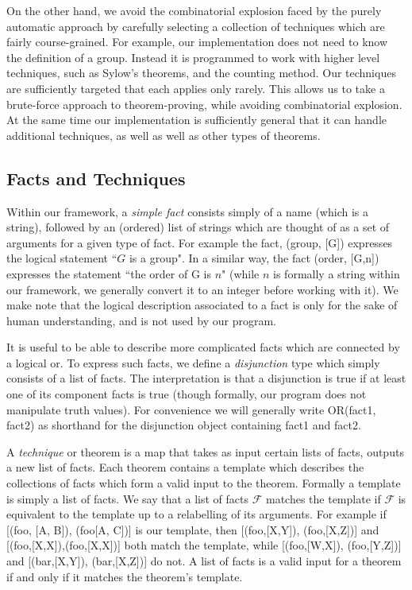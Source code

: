 \documentclass[11pt, oneside]{article}   	%
\begin{document}
On the other hand, we avoid the combinatorial explosion faced by the purely automatic approach by carefully selecting a collection of techniques which are fairly course-grained.  For example, our implementation does not need to know the definition of a group.  Instead it is programmed to work with higher level techniques, such as Sylow's theorems, and the counting method.  Our techniques are sufficiently targeted that each applies only rarely.  This allows us to take a brute-force approach to theorem-proving, while avoiding combinatorial explosion.  At the same time our implementation is sufficiently general that it can handle additional techniques, as well as well as other types of theorems.

\subsection{Facts and Techniques}

Within our framework, a \textit{simple fact} consists simply of a name (which is a string), followed by an (ordered) list of strings which are thought of as a set of arguments for a given type of fact.  For example the fact, (group, [G]) expresses the logical statement ``$G$ is a group". In a similar way, the fact (order, [G,n]) expresses the statement ``the order of G is $n$"  (while $n$ is formally a string within our framework, we generally convert it to an integer before working with it).  We make note that the logical description associated to a fact is only for the sake of human understanding, and is not used by our program.

It is useful to be able to describe more complicated facts which are connected by a logical or.  To express such facts, we define a \textit{disjunction} type which simply consists of a list of facts.  The interpretation is that a disjunction is true if at least one of its component facts is true (though formally, our program does not manipulate truth values).  For convenience we will generally write OR(fact1, fact2) as shorthand for the disjunction object containing fact1 and fact2.

A \textit{technique} or theorem is a map that takes as input certain lists of facts, outputs a new list of facts.  Each theorem contains a template which describes the collections of facts which form a valid input to the theorem.  Formally a template is simply a list of facts.  We say that a list of facts $\mathcal{F}$ matches the template if $\mathcal{F}$ is equivalent to the template up to a relabelling of its arguments.  For example if [(foo, [A, B]), (foo[A, C])] is our template, then [(foo,[X,Y]), (foo,[X,Z])] and [(foo,[X,X]),(foo,[X,X])] both match the template, while [(foo,[W,X]), (foo,[Y,Z])] and [(bar,[X,Y]), (bar,[X,Z])] do not.  A list of facts is a valid input for a theorem if and only if it matches the theorem's template.  
\end{document}
